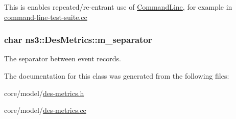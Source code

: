 This is enables repeated/re-\/entrant use of \hyperlink{classns3_1_1CommandLine}{Command\+Line}, for example in {\ttfamily \hyperlink{command-line-test-suite_8cc}{command-\/line-\/test-\/suite.\+cc}} 
\subsubsection[{\texorpdfstring{m\+\_\+separator}{m_separator}}]{\setlength{\rightskip}{0pt plus 5cm}char ns3\+::\+Des\+Metrics\+::m\+\_\+separator\hspace{0.3cm}{\ttfamily [private]}}\hypertarget{classns3_1_1DesMetrics_ab4a6d1bac1d7bae3db17cf362d4afaa8}{}\label{classns3_1_1DesMetrics_ab4a6d1bac1d7bae3db17cf362d4afaa8}


The separator between event records. 



The documentation for this class was generated from the following files\+:\begin{DoxyCompactItemize}
\item 
core/model/\hyperlink{des-metrics_8h}{des-\/metrics.\+h}\item 
core/model/\hyperlink{des-metrics_8cc}{des-\/metrics.\+cc}\end{DoxyCompactItemize}
